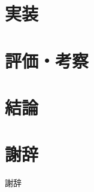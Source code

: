 \documentclass[12pt]{b-thesis}
\begin{document}
\chapter{実装}
\label{chap:implementation}


\chapter{評価・考察}
\label{chap:validation}


\chapter{結論}
\label{chap:conclusion}


\chapter*{謝辞}
{\protect\numberline {}謝辞}


\thispagestyle{plain}
%


\end{document}
